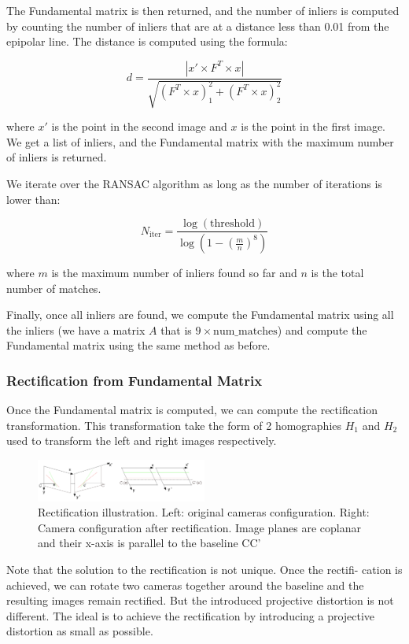\documentclass[10pt,twocolumn,letterpaper]{article}
\begin{document}
The Fundamental matrix is then returned, and the number of inliers is computed by counting the number of inliers that are at a distance less than 0.01 from the epipolar line. The distance is computed using the formula:

\[
d = \frac{|x' \times F^T \times x|}{\sqrt{(F^T \times x)_1^2 + (F^T \times x)_2^2}}
\]

where \(x'\) is the point in the second image and \(x\) is the point in the first image. We get a list of inliers, and the Fundamental matrix with the maximum number of inliers is returned.

We iterate over the RANSAC algorithm as long as the number of iterations is lower than:

\[
N_{\text{iter}} = \frac{\log(\text{threshold})}{\log(1 - \left(\frac{m}{n}\right)^8)}
\]

where \(m\) is the maximum number of inliers found so far and \(n\) is the total number of matches.

Finally, once all inliers are found, we compute the Fundamental matrix using all the inliers (we have a matrix \(A\) that is \(9 \times \text{num\_matches}\)) and compute the Fundamental matrix using the same method as before.

\subsubsection{Rectification from Fundamental Matrix}

Once the Fundamental matrix is computed, we can compute the rectification transformation. This transformation take the form of 2 homographies \(H_1\) and \(H_2\) used to transform the left and right images respectively. 

\begin{figure}[htbp]
    \centering
    \includegraphics[width=0.5\textwidth]{rectification.png}
    \caption{Rectification illustration. Left: original cameras configuration. Right:
    Camera configuration after rectification. Image planes are coplanar and their
    x-axis is parallel to the baseline CC'}
    \label{fig:rectification}
\end{figure}

Note that the solution to the rectification is not unique. Once the rectifi-
cation is achieved, we can rotate two cameras together around the baseline
and the resulting images remain rectified. But the introduced projective
distortion is not different. The ideal is to achieve the rectification by
introducing a projective distortion as small as possible.
\end{document}
